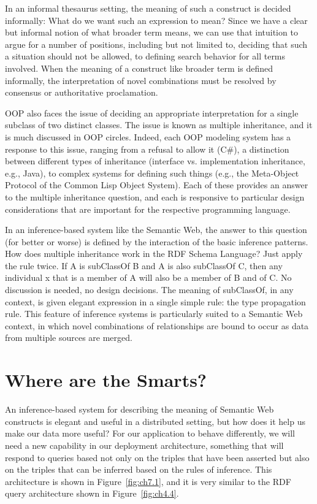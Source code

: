 In an informal thesaurus setting, the meaning of such a construct is
decided informally: What do we
want such an expression to mean? Since we have a clear but informal
notion of what broader term means, we can use that intuition to argue
for a number of positions, including but not limited to, deciding that
such a situation should not be allowed, to defining search behavior for
all terms involved. When the meaning of a construct like broader term is
defined informally, the interpretation of novel combinations must be
resolved by consensus or authoritative proclamation.


\begin{sidebar}{}
OOP also faces the issue of deciding an appropriate interpretation for a
single subclass of two distinct classes. The issue is known as multiple
inheritance, and it is much discussed in OOP circles. Indeed, each OOP
modeling system has a response to this issue, ranging from a refusal to
allow it (C\#), a distinction between different types of inheritance
(interface vs. implementation inheritance, e.g., Java), to complex
systems for defining such things (e.g., the Meta-Object Protocol of the
Common Lisp Object System). Each of these provides an answer to the
multiple inheritance question, and each is responsive to particular
design considerations that are important for the respective programming
language.
\end{sidebar}

In an inference-based system like the Semantic Web, the answer to this
question (for better or worse) is defined by the interaction of the
basic inference patterns. How does multiple inheritance work in the RDF
Schema Language? Just apply the rule twice. If A is subClassOf B and A
is also subClassOf C, then any individual x that is a member of A will
also be a member of B and of C. No discussion is needed, no design
decisions. The meaning of subClassOf, in any context, is given elegant
expression in a single simple rule: the type propagation rule. This
feature of inference systems is particularly suited to a Semantic Web
context, in which novel combinations of relationships are bound to occur
as data from multiple sources are merged.

\section{Where are the Smarts?}

An inference-based system for describing the meaning of Semantic Web
constructs is elegant and useful in a distributed setting, but how does
it help us make our data more useful? For our application to behave
differently, we will need a new capability in our deployment
architecture, something that will respond to queries based not only on
the triples that have been asserted but also on the triples that can be
inferred based on the rules of inference. This architecture is shown in
Figure~\ref{fig:ch7.1}, and it is very similar to the RDF query architecture shown
in Figure~\ref{fig:ch4.4}.

